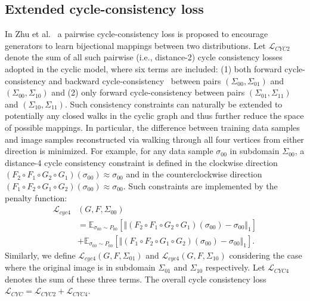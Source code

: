 \documentclass[10pt,twocolumn,letterpaper]{article}
\begin{document}
\subsection{Extended cycle-consistency loss}
In Zhu et al.~\cite{CycleGAN} a pairwise cycle-consistency loss is proposed to encourage generators to learn bijectional mappings between two distributions. Let $\mathcal{L}_{CYC2}$ denote the sum of all such pairwise (i.e., distance-2) cycle consistency losses adopted in the cyclic model, where six terms are included: (1) both forward cycle-consistency and backward cycle-consistency~\cite{CycleGAN} between pairs $(\Sigma_{00},\Sigma_{01})$ and $(\Sigma_{00},\Sigma_{10})$ and (2) only forward cycle-consistency between pairs  $(\Sigma_{01},\Sigma_{11})$ and $(\Sigma_{10},\Sigma_{11})$. Such consistency constraints can naturally be extended to potentially any closed walks in the cyclic graph and thus further reduce the space of possible mappings. In particular, the difference between training data samples and image samples reconstructed via walking through all four vertices from either direction is minimized. For example, for any data sample $\sigma_{00}$ in subdomain $\Sigma_{00}$, a distance-4 cycle consistency constraint is defined in the clockwise direction $(F_2 \circ F_1 \circ G_2 \circ G_1)(\sigma_{00})\approx \sigma_{00}$ and in the counterclockwise direction $(F_1\circ F_2\circ G_1\circ G_2)(\sigma_{00})\approx \sigma_{00}$. Such constraints are implemented by the penalty function:
\begin{align}
\mathcal{L}_{cyc4}&(G,F,\Sigma_{00}) \nonumber \\
&= \mathbb{E}_{\sigma_{00}\sim P_{00}}[\Vert (F_2\circ F_1\circ G_2\circ G_1)(\sigma_{00})-\sigma_{00}\Vert_1] \nonumber \\
&+\mathbb{E}_{\sigma_{00}\sim P_{00}}[\Vert (F_1\circ F_2\circ G_1\circ G_2)(\sigma_{00})-\sigma_{00}\Vert_1].
\end{align}
Similarly, we define $\mathcal{L}_{cyc4}(G,F,\Sigma_{01})$ and $\mathcal{L}_{cyc4}(G,F,\Sigma_{10})$ considering the case where the original image is in subdomain $\Sigma_{01}$ and $\Sigma_{10}$ respectively. Let $\mathcal{L}_{CYC4}$ denotes the sum of these three terms. The overall cycle consistency loss $\mathcal{L}_{CYC}=\mathcal{L}_{CYC2}+\mathcal{L}_{CYC4}$.

\end{document}
